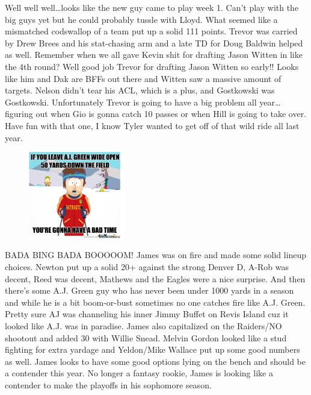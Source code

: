 \documentclass[11pt,letterpaper]{article}
\begin{document}
\par\noindent Well well well\dots looks like the new guy came to play week 1. Can't play with the big guys yet but he could probably tussle with Lloyd. What seemed like a mismatched codswallop of a team put up a solid 111 points. Trevor was carried by Drew Brees and his stat-chasing arm and a late TD for Doug Baldwin helped as well. Remember when we all gave Kevin shit for drafting Jason Witten in like the 4th round? Well good job Trevor for drafting Jason Witten so early!! Looks like him and Dak are BFFs out there and Witten saw a massive amount of targets. Nelson didn't tear his ACL, which is a plus, and Gostkowski was Gostkowski. Unfortunately Trevor is going to have a big problem all year\dots figuring out when Gio is gonna catch 10 passes or when Hill is going to take over. Have fun with that one, I know Tyler wanted to get off of that wild ride all last year.
\begin{figure}
\centering
\includegraphics[width=0.375\textwidth]{week1-green.png}
\label{fig:week1-green}
\end{figure} 
\bigskip
\par\noindent BADA BING BADA \LARGE BOOOOOM! \normalsize James was on fire and made some solid lineup choices. Newton put up a solid 20+ against the strong Denver D, A-Rob was decent, Reed was decent, Mathews and the Eagles were a nice surprise. And then there's some A.J. Green guy who has never been under 1000 yards in a season and while he is a bit boom-or-bust sometimes no one catches fire like A.J. Green. Pretty sure AJ was channeling his inner Jimmy Buffet on Revis Island cuz it looked like A.J. was in paradise. James also capitalized on the Raiders/NO shootout and added 30 with Willie Snead. Melvin Gordon looked like a stud fighting for extra yardage and Yeldon/Mike Wallace put up some good numbers as well. James looks to have some good options lying on the bench and should be a contender this year. No longer a fantasy rookie, James is looking like a contender to make the playoffs in his sophomore season. 
\end{document}
